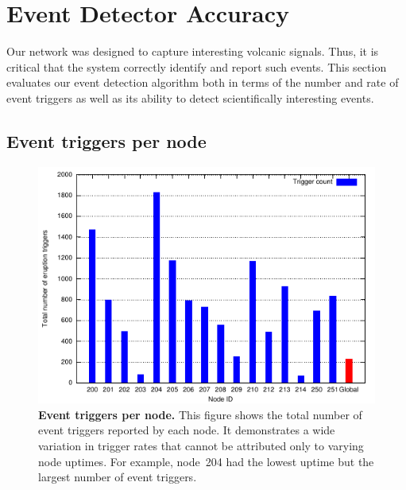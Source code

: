 
\section{Event Detector Accuracy}
\label{sec-eventdetection}

Our network was designed to capture interesting volcanic signals.  Thus, it
is critical that the system correctly identify and report such events.  This
section evaluates our event detection algorithm both in terms of the number
and rate of event triggers as well as its ability to detect
scientifically interesting events.

\subsection{Event triggers per node}

\begin{figure}[t]
\label{evaluation-fig-eventspernode}
\begin{center}
\includegraphics[width=\hsize]{./5-evaluation/figs/eventdetection/eruptionTriggers/eruptCount.pdf}
\end{center}
\caption{\textbf{Event triggers per node.}
This figure shows the total number of event triggers reported by each node.
It demonstrates a wide variation in trigger rates that cannot be attributed
only to varying node uptimes. For example, node~204 had the lowest uptime but
the largest number of event triggers.}
\end{figure}

